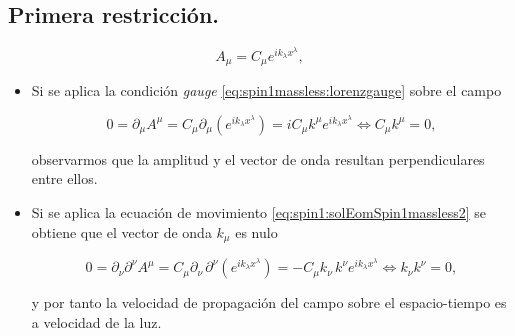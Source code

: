 \vspace{4mm}
\subsection{Primera restricción.}


\begin{equation} 
	A_{\mu} = C_{\mu} e^{ik_{\lambda}x^{\lambda}},
\end{equation}


\begin{itemize}

	\item Si se aplica la condición \textit{gauge} \eqref{eq:spin1massless:lorenzgauge} sobre el campo 

	\begin{equation} \label{eq:Spin1massless:Condition1}
		0 = \partial_{\mu}A^{\mu} = 
		C_{\mu} \partial_{\mu} \left(e^{ik_{\lambda}x^{\lambda}}\right) = 
		iC_{\mu} k^{\mu} e^{ik_{\lambda}x^{\lambda}} \iff C_{\mu} k^{\mu} = 0,
	\end{equation}
	
	observarmos que la amplitud y el vector de onda resultan perpendiculares entre ellos.

	\item Si se aplica la ecuación de movimiento \eqref{eq:spin1:solEomSpin1massless2} se obtiene que el vector de onda $k_{\mu}$ es nulo

	\begin{equation} \label{eq:Spin1massless:Condition2}
		0 = \partial_{\nu}\partial^{\nu}A^{\mu} = 
		C_{\mu} \partial_{\nu}\,\partial^{\nu} \left(e^{ik_{\lambda}x^{\lambda}}\right) = 
		-C_{\mu} k_{\nu}\,k^{\nu} e^{ik_{\lambda}x^{\lambda}} \iff k_{\nu}k^{\nu}= 0,
	\end{equation}

	y por tanto la velocidad de propagación del campo sobre el espacio-tiempo es a velocidad de la luz.

\end{itemize}

